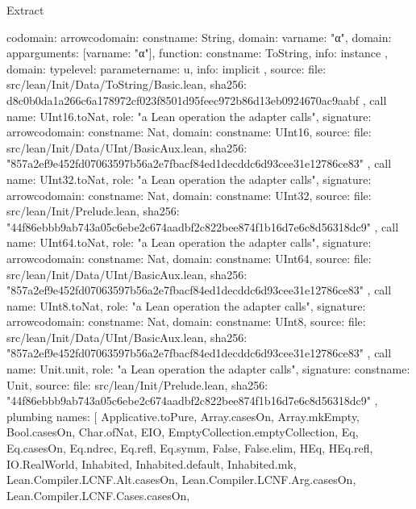 \begin{lexlean}{Extract}
\begin{toolingmodule}
{{{{          codomain: arrow{codomain: const{name: String}, domain: var{name: "α"}},
          domain: app{arguments: [var{name: "α"}], function: const{name: ToString}},
          info: instance
        },
        domain: type{level: parameter{name: u}},
        info: implicit
      },
      source: {
        file: src/lean/Init/Data/ToString/Basic.lean,
        sha256: d8c0b0da1a266c6a178972cf023f8501d95feec972b86d13eb0924670ac9aabf
      }
    },
    call{
      name: UInt16.toNat,
      role: "a Lean operation the adapter calls",
      signature: arrow{codomain: const{name: Nat}, domain: const{name: UInt16}},
      source: {
        file: src/lean/Init/Data/UInt/BasicAux.lean,
        sha256: "857a2ef9e452fd07063597b56a2e7fbacf84ed1decddc6d93cee31e12786ce83"
      }
    },
    call{
      name: UInt32.toNat,
      role: "a Lean operation the adapter calls",
      signature: arrow{codomain: const{name: Nat}, domain: const{name: UInt32}},
      source: {
        file: src/lean/Init/Prelude.lean,
        sha256: "44f86ebbb9ab743a05c6ebe2c674aadbf2c822bee874f1b16d7e6c8d56318dc9"
      }
    },
    call{
      name: UInt64.toNat,
      role: "a Lean operation the adapter calls",
      signature: arrow{codomain: const{name: Nat}, domain: const{name: UInt64}},
      source: {
        file: src/lean/Init/Data/UInt/BasicAux.lean,
        sha256: "857a2ef9e452fd07063597b56a2e7fbacf84ed1decddc6d93cee31e12786ce83"
      }
    },
    call{
      name: UInt8.toNat,
      role: "a Lean operation the adapter calls",
      signature: arrow{codomain: const{name: Nat}, domain: const{name: UInt8}},
      source: {
        file: src/lean/Init/Data/UInt/BasicAux.lean,
        sha256: "857a2ef9e452fd07063597b56a2e7fbacf84ed1decddc6d93cee31e12786ce83"
      }
    },
    call{
      name: Unit.unit,
      role: "a Lean operation the adapter calls",
      signature: const{name: Unit},
      source: {
        file: src/lean/Init/Prelude.lean,
        sha256: "44f86ebbb9ab743a05c6ebe2c674aadbf2c822bee874f1b16d7e6c8d56318dc9"
      }
    },
    plumbing{
      names: [
        Applicative.toPure,
        Array.casesOn,
        Array.mkEmpty,
        Bool.casesOn,
        Char.ofNat,
        EIO,
        EmptyCollection.emptyCollection,
        Eq,
        Eq.casesOn,
        Eq.ndrec,
        Eq.refl,
        Eq.symm,
        False,
        False.elim,
        HEq,
        HEq.refl,
        IO.RealWorld,
        Inhabited,
        Inhabited.default,
        Inhabited.mk,
        Lean.Compiler.LCNF.Alt.casesOn,
        Lean.Compiler.LCNF.Arg.casesOn,
        Lean.Compiler.LCNF.Cases.casesOn,
}}
\end{toolingmodule}
\end{lexlean}
